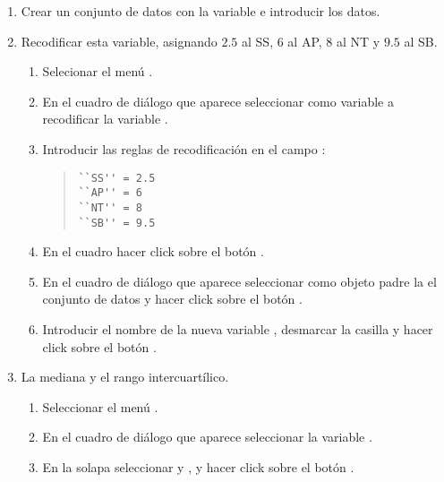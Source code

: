\begin{enumerate}[leftmargin=*]
\begin{enumerate}
\item  Crear un conjunto de datos  con la variable  e introducir los datos.

\item  Recodificar esta variable, asignando $2.5$ al SS, $6$ al AP, $8$ al NT y $9.5$ al SB.
\begin{indicacion}{
\begin{enumerate}
\item Selecionar el menú .
\item En el cuadro de diálogo que aparece seleccionar como variable a recodificar la variable .
\item Introducir las reglas de recodificación en el campo :
\begin{quote}
\lstinline{``SS'' = 2.5}\\
\lstinline{``AP'' = 6}\\
\lstinline{``NT'' = 8}\\
\lstinline{``SB'' = 9.5}
\end{quote}
\item En el cuadro  hacer click sobre el botón .
\item En el cuadro de diálogo que aparece seleccionar como objeto padre la el conjunto de datos  y hacer click sobre el botón .
\item Introducir el nombre de la nueva variable , desmarcar la casilla  y hacer click sobre el botón .
\end{enumerate}}
\end{indicacion}

\item La mediana y el rango intercuartílico.
\begin{indicacion}{
\begin{enumerate}
\item Seleccionar el menú .
\item En el cuadro de diálogo que aparece seleccionar la variable .
\item En la solapa  seleccionar  y , 
y hacer click sobre el botón .
\end{enumerate}}
\end{indicacion}
\end{enumerate}


\end{enumerate}
